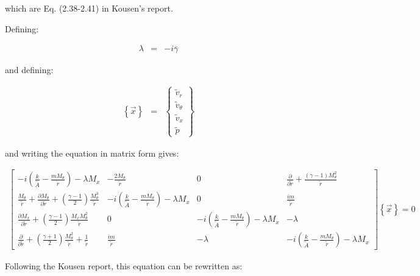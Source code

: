 \documentclass[12pt]{article}
\begin{document}
which are Eq. (2.38-2.41) in Kousen's report.

Defining:

\begin{eqnarray}
\lambda &=& -i \overline{\gamma}
\nonumber
\end{eqnarray}

and defining:

\begin{eqnarray}
\left\{\vec{x} \right\} 
&=& 
\left\{
\begin{array}{l}
\widetilde{v}_r
\\
\widetilde{v}_{\theta}
\\
\widetilde{v}_x
\\
\widetilde{p}
\end{array}
\right\}
\nonumber
\end{eqnarray}

and writing the equation in matrix form gives:

\begin{tiny}
\begin{eqnarray}
\left[
\begin{array}{cccc}
-i
\left(
\frac{k}{\widetilde{A}}
- \frac{ m M_{\theta} }{\widetilde{r} }
\right) - \lambda M_x
&
-\frac{2 M_{\theta}}{\widetilde{r}}
&
0
&
\frac{\partial}{\partial \widetilde{r}}
+ \frac{\left(\gamma - 1 \right) M_{\theta}^2}{\widetilde{r}}
\\
\frac{M_{\theta} }{\widetilde{r}}
+
\frac{\partial M_{\theta} }{\partial \widetilde{r}}
+
\left(\frac{\gamma - 1}{2} \right) \frac{M_{\theta}^3}{\widetilde{r}}
&
-i
\left(
\frac{k}{\widetilde{A}}
- \frac{ m M_{\theta} }{\widetilde{r} }
\right) - \lambda M_x
&
0
&
\frac{i m}{\widetilde{r}}
\\
\frac{\partial M_x }{\partial \widetilde{r}} 
+
\left(\frac{\gamma - 1}{2} \right) \frac{M_x M_{\theta}^2}{\widetilde{r}}
&
0
&
-i
\left(
\frac{k}{\widetilde{A}}
- \frac{ m M_{\theta} }{\widetilde{r} }
\right) - \lambda M_x
&
-\lambda
\\
\frac{\partial}{\partial \widetilde{r}}
+ 
\left(\frac{\gamma + 1}{2} \right) \frac{M_{\theta}^2}{\widetilde{r}}
+\frac{1 }{\widetilde{r}} 
&
\frac{i m}{\widetilde{r}}
&
-\lambda
&
-i
\left(
\frac{k}{\widetilde{A}}
- \frac{ m M_{\theta} }{\widetilde{r} }
\right) - \lambda M_x
\end{array}
\right]
\left\{\vec{x} \right\} 
= 0
\nonumber
\end{eqnarray}
\end{tiny}%

Following the Kousen report, this equation can be rewritten as:
\end{document}
